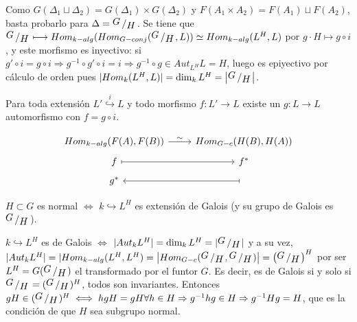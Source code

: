 \begin{teo}
Como $G(\Delta_1 \sqcup \Delta_2) = G(\Delta_1) \times G(\Delta_2)$ y $F(A_1\times A_2) = F(A_1)\sqcup F(A_2)$, basta probarlo para $\Delta=\modulo{G}{H}$. Se tiene que $\modulo{G}{H}\longmapsto Hom_{k-alg} (Hom_{G-conj}(\modulo{G}{H}, L)) \simeq Hom_{k-alg}(L^H,L)$ por $g \cdot H \longmapsto g\circ i$, y este morfismo es inyectivo: si $g'\circ i = g\circ i \Rightarrow g^{-1}\circ g' \circ i = i \Rightarrow g^{-1} \circ g \in Aut_{L^H} L = H $, luego es epiyectivo por c\'alculo de orden pues $|Hom_{k}(L^H,L)| = \dim_k L^H = \left|\modulo{G}{H}\right|$. 
\end{teo}
\begin{teo}
    [de prolongaci\'on] Para toda extensi\'on $L' \overset{i}{\hookrightarrow} L$ y todo morfismo $f: L ' \longrightarrow L$ existe un $g: L \longrightarrow L$ automorfismo con $f=g\circ i$. 
\end{teo}
\begin{prop}
    $$\bt Hom_{k-alg}(F(A),F(B)) \rar{\sim} & Hom_{G-c}(H(B),H(A)) \\[-5mm] f \rarmaps & f^* \\[-5mm] g^* & \arrow[mapsto]{l} \et$$
\end{prop}
\begin{cor}
    $H \subset G$ es normal $\iff$ $k \hookrightarrow L^H$ es extensi\'on de Galois (y su grupo de Galois es $\modulo{G}{H}$).
\end{cor}
\begin{dem}
    $k \hookrightarrow L^H$ es de Galois $\iff$ $|Aut_k L^H| = \dim_k L^H = |\modulo{G}{H}|$ y a su vez, $|Aut_k L^H| = |Hom_{k-alg}(L^H,L^H) = \left|Hom_{G-c}(\modulo{G}{H}, \modulo{G}{H})\right| =  \left(\modulo{G}{H}\right)^H$ por ser $L^H = G(\modulo{G}{H})$ el transformado por el funtor $G$.  Es decir, es de Galois si y solo si $\modulo{G}{H}= (\modulo{G}{H})^H$, todos son invariantes. Entonces $gH \in (\modulo{G}{H})^H \iff hgH = gH \forall h\in H \Rightarrow g^{-1} h g \in H \Rightarrow g^{-1} H g = H$, que es la condici\'on de que $H$ sea subgrupo normal. 
\end{dem}
